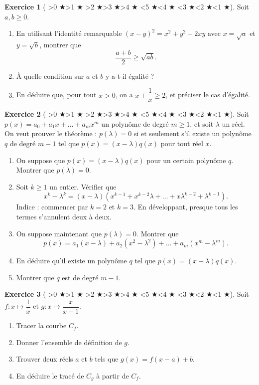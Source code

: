 \documentclass[12pt,a4paper]{article}
\newcommand{\diff}[1]{%
  \textcolor{orange!80!black}{\ifnum#1>0 $\bigstar$\fi\ifnum#1>1 $\bigstar$\fi
  \ifnum#1>2 $\bigstar$\fi\ifnum#1>3 $\bigstar$\fi\ifnum#1>4 $\bigstar$\fi}%
  \textcolor{gray!40}{\ifnum#1<5 $\bigstar$\fi\ifnum#1<4 $\bigstar$\fi
  \ifnum#1<3 $\bigstar$\fi\ifnum#1<2 $\bigstar$\fi\ifnum#1<1 $\bigstar$\fi}}
\theoremstyle{plain}
\theoremstyle{definition}
\newtheorem{exercise}{Exercice}
\theoremstyle{remark}
\begin{document}
\begin{exercise}[\diff{4}]
Soit $a, b \ge 0$.
\begin{enumerate}[label=\alph*)]
  \item En utilisant l'identité remarquable $(x - y)^2 = x^2 + y^2 - 2xy$ avec
  $x = \sqrt{a}$ et $y = \sqrt{b}$, montrer que
  \[
    \frac{a + b}{2} \ge \sqrt{ab}.
  \]
  \item À quelle condition sur $a$ et $b$ y a-t-il égalité ?
  \item En déduire que, pour tout $x > 0$, on a $x + \dfrac{1}{x} \ge 2$, et préciser
  le cas d'égalité.
\end{enumerate}
\label{ex:am_gm}
\end{exercise}

\begin{exercise}[\diff{5}]
Soit $p(x) = a_0 + a_1 x + \dots + a_m x^m$ un polynôme de degré $m \ge 1$, et soit
$\lambda$ un réel. On veut prouver le théorème : $p(\lambda) = 0$ si et seulement
s'il existe un polynôme $q$ de degré $m - 1$ tel que $p(x) = (x - \lambda)q(x)$
pour tout réel $x$.
\begin{enumerate}[label=\alph*)]
  \item On suppose que $p(x) = (x - \lambda)q(x)$ pour un certain polynôme $q$.
  Montrer que $p(\lambda) = 0$.
  \item Soit $k \ge 1$ un entier. Vérifier que
  \[
    x^k - \lambda^k = (x - \lambda)\left(x^{k-1} + x^{k-2}\lambda + \dots +
    x\lambda^{k-2} + \lambda^{k-1}\right).
  \]
  Indice : commencer par $k = 2$ et $k = 3$. En développant, presque tous les termes
  s'annulent deux à deux.
  \item On suppose maintenant que $p(\lambda) = 0$. Montrer que
  \[
    p(x) = a_1(x - \lambda) + a_2(x^2 - \lambda^2) + \dots + a_m(x^m - \lambda^m).
  \]
  \item En déduire qu'il existe un polynôme $q$ tel que $p(x) = (x - \lambda)q(x)$.
  \item Montrer que $q$ est de degré $m - 1$.
\end{enumerate}
\label{ex:root_fact}
\end{exercise}

\begin{exercise}[\diff{2}]
Soit $f : x \mapsto \dfrac{1}{x}$ et $g : x \mapsto \dfrac{x}{x - 1}$.
\begin{enumerate}[label=\alph*)]
  \item Tracer la courbe $C_f$.
  \item Donner l'ensemble de définition de $g$.
  \item Trouver deux réels $a$ et $b$ tels que
  $g(x) = f(x - a) + b$.
  \item En déduire le tracé de $C_g$ à partir de $C_f$.
\end{enumerate}
\label{ex:translation}
\end{exercise}
\end{document}
